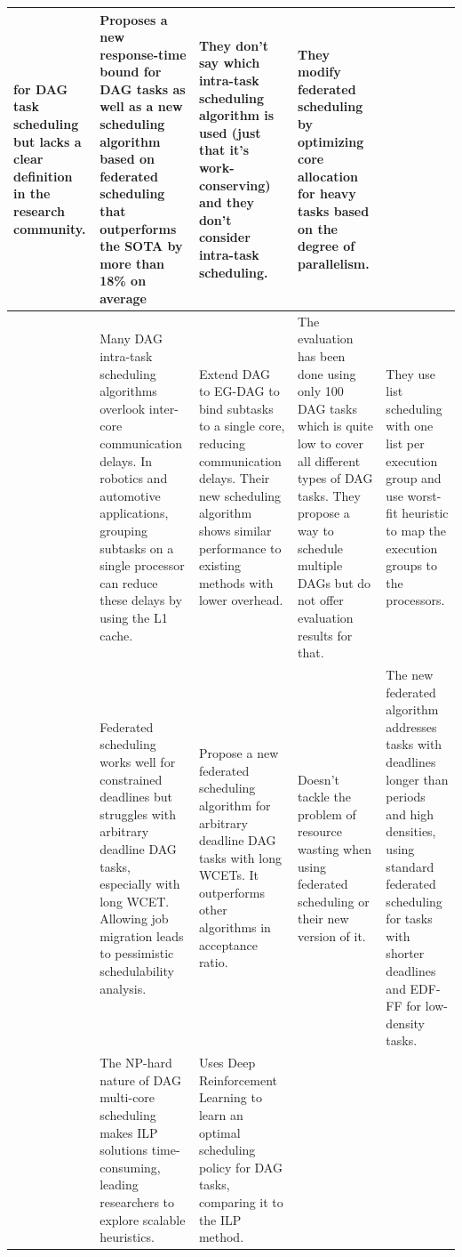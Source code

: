 \begin{table}
\begin{tabular}[]{|p{0.15in}|p{1.6in}|p{1.6in}|p{1.6in}|p{1.6in}|}
        for DAG task scheduling but lacks a clear definition in the research community. & Proposes a new response-time bound for DAG tasks
        as well as a new scheduling algorithm based on federated scheduling that outperforms the SOTA
        by more than 18\% on average & They don't say which intra-task scheduling algorithm is used (just that it's work-conserving)
        and they don't consider intra-task scheduling. & They modify federated scheduling by optimizing core allocation for heavy tasks based on the degree of parallelism. \\
        \hline
        \cite{Shi2024DagExecGroups}  & Many DAG intra-task scheduling algorithms overlook inter-core communication delays. 
        In robotics and automotive applications, grouping subtasks on a 
        single processor can reduce these delays by using the L1 cache. 
        & Extend DAG to EG-DAG to bind subtasks to a single core, 
        reducing communication delays. Their new scheduling algorithm shows similar performance to existing methods with lower overhead.
         & The evaluation has been done using only 100 DAG tasks which 
         is quite low to cover all different types of DAG tasks.
         They propose a way to schedule multiple DAGs but do not offer
         evaluation results for that. & They use list scheduling with one list per execution group 
         and use worst-fit heuristic to map the execution groups to the processors. \\
        \hline
        \cite{Guan2023FederatedNew}  & Federated scheduling works well for constrained deadlines but struggles with arbitrary deadline DAG tasks,
         especially with long WCET. Allowing job migration leads to pessimistic schedulability analysis. & 
         Propose a new federated scheduling algorithm for arbitrary deadline DAG tasks with long WCETs. It outperforms other algorithms in acceptance ratio.
        & Doesn't tackle the problem of resource wasting when using federated scheduling
        or their new version of it. & The new federated algorithm addresses tasks with deadlines longer than periods and high densities, using standard federated scheduling 
        for tasks with shorter deadlines and EDF-FF for low-density tasks.\\
        \hline
        \cite{Zhao2024GATDRLmodel} & The NP-hard nature of DAG multi-core scheduling makes ILP solutions time-consuming, 
        leading researchers to explore scalable heuristics. & Uses Deep Reinforcement Learning to learn an optimal scheduling policy for DAG tasks, comparing it to the ILP method.

\end{tabular}
\end{table}
